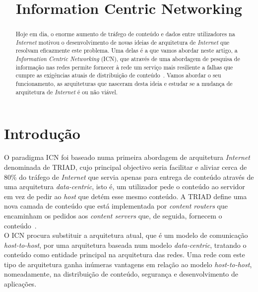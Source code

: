 \documentclass[conference]{IEEEtran}
\begin{document}
\title{Information Centric Networking}

\author{

}

\maketitle

\begin{abstract}
Hoje em dia, o enorme aumento de tr\'{a}fego de conte\'{u}do e dados entre utilizadores na \textit{Internet} motivou o desenvolvimento de novas ideias de arquitetura de \textit{Internet} que resolvam eficazmente este problema. Uma delas \'{e} a que vamos abordar neste artigo, a \textit{Information Centric Networking} (ICN), que atrav\'{e}s de uma abordagem de pesquisa de informa\c{c}\~{a}o nas redes permite fornecer \`{a} rede um servi\c{c}o mais resiliente a falhas que cumpre as exig\^{e}ncias atuais de distribui\c{c}\~{a}o de conte\'{u}do~\cite{ahlgren}. Vamos abordar o seu funcionamento, as arquiteturas que nasceram desta ideia e estudar se a mudan\c{c}a de arquitetura de \textit{Internet} \'{e} ou n\~{a}o vi\'{a}vel. 
\end{abstract}

\section{Introdu\c{c}\~{a}o}
O paradigma ICN foi baseado numa primeira abordagem de arquitetura \textit{Internet} denominada de TRIAD\cite{triad}, cujo principal objectivo seria facilitar e aliviar cerca de 80\% do tr\'{a}fego de \textit{Internet} que servia apenas para entrega de conte\'{u}do atrav\'{e}s de uma arquitetura \textit{data-centric}, isto \'{e}, um utilizador pede o conte\'{u}do ao servidor em vez de pedir ao \textit{host} que det\'{e}m esse mesmo conte\'{u}do\cite{ahlgren}. A TRIAD define uma nova camada de conte\'{u}do que est\'{a} implementada por \textit{content routers} que encaminham os pedidos aos \textit{content servers} que, de seguida, fornecem o conte\'{u}do~.\\

O ICN procura substituir a arquitetura atual, que \'{e} um modelo de comunica\c{c}\~{a}o \textit{host-to-host}, por uma arquitetura baseada num modelo \textit{data-centric}, tratando o conte\'{u}do como entidade principal na arquitetura das redes. Uma rede com este tipo de arquitetura ganha in\'{u}meras vantagens em rela\c{c}\~{a}o ao modelo \textit{host-to-host}, nomeadamente, na distribui\c{c}\~{a}o de conte\'{u}do, seguran\c{c}a e desenvolvimento de aplica\c{c}\~{o}es\cite{icn}.\\
\end{document}
